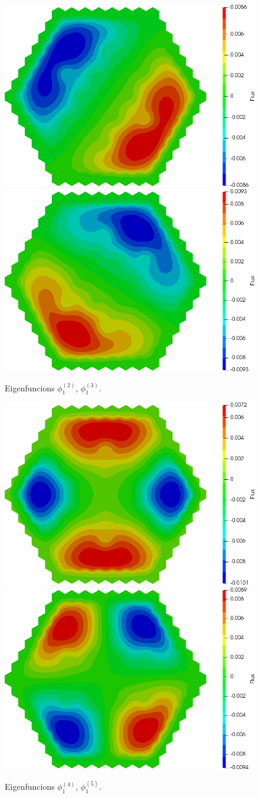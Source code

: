 \documentclass[authoryear]{elsarticle}
\begin{document}
\begin{figure}[h]
\begin{center}
	\includegraphics[width=0.49\linewidth]{iaea_with/alpha_sp3_u1_2.png}
	\includegraphics[width=0.49\linewidth]{iaea_with/alpha_sp3_u1_3.png}\\
	\caption{Eigenfuncions $\phi_1^{(2)}$, $\phi_1^{(3)}$.}
	\label{fig:iaea_with_fun_2}
\end{center}
\end{figure}

\begin{figure}[h]
\begin{center}
	\includegraphics[width=0.49\linewidth]{iaea_with/alpha_sp3_u1_4.png}
	\includegraphics[width=0.49\linewidth]{iaea_with/alpha_sp3_u1_5.png}\\
	\caption{Eigenfuncions $\phi_1^{(4)}$, $\phi_1^{(5)}$.}
	\label{fig:iaea_with_fun_3}
\end{center}
\end{figure}
\end{document}
